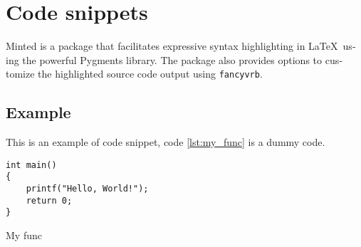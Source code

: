 \section{Code snippets}

Minted is a pack­age that fa­cil­i­tates ex­pres­sive syn­tax high­light­ing in \LaTeX\ us­ing the pow­er­ful Pyg­ments li­brary. The pack­age also pro­vides op­tions to cus­tomize the high­lighted source code out­put us­ing \texttt{fan­cyvrb}.

\subsection{Example}
This is an example of code snippet, code \ref{lst:my_func} is a dummy code.

\begin{codesnippet}
\begin{verbatim}
int main()
{
    printf("Hello, World!");
    return 0;
}
\end{verbatim}
\caption{My func}\label{lst:my_func}
\end{codesnippet}